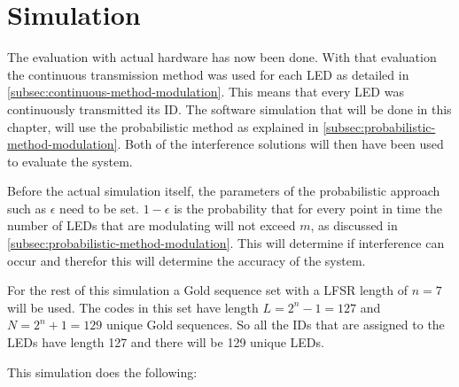 
\section{Simulation}
\label{sec:simulation-evaluation}

The evaluation with actual hardware has now been done.
With that evaluation the continuous transmission method was used for each LED as detailed in \autoref{subsec:continuous-method-modulation}.
This means that every LED was continuously transmitted its ID.
The software simulation that will be done in this chapter, will use the probabilistic method as explained in \autoref{subsec:probabilistic-method-modulation}.
Both of the interference solutions will then have been used to evaluate the system.




Before the actual simulation itself, the parameters of the probabilistic approach such as $\epsilon$ need to be set.
$1 - \epsilon$ is the probability that for every point in time the number of LEDs that are modulating will not exceed $m$, as discussed in \autoref{subsec:probabilistic-method-modulation}.
This will determine if interference can occur and therefor this will determine the accuracy of the system.

For the rest of this simulation a Gold sequence set with a LFSR length of $n = 7$ will be used.
The codes in this set have length $L = 2^n - 1 = 127$ and $N = 2^n + 1 = 129$ unique Gold sequences.
So all the IDs that are assigned to the LEDs have length 127 and there will be 129 unique LEDs.

This simulation does the following: 

